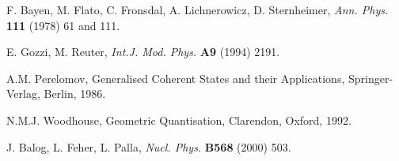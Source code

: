 \documentclass[a4paper,12pt]{article}
\begin{document}
\begin{thebibliography}{xx}
 F. Bayen, M. Flato, C. Fronsdal, A. Lichnerowicz, D.
  Sternheimer, {\it Ann. Phys.} {\bf 111} (1978) 61 and 111.

 E. Gozzi, M. Reuter,
{\it  Int.J. Mod. Phys.} {\bf A9} (1994) 2191.


 A.M. Perelomov, Generalised Coherent States and
  their Applications, Springer-Verlag, Berlin, 1986.

 N.M.J. Woodhouse, Geometric Quantisation,
  Clarendon, Oxford, 1992.

 J. Balog, L. Feher, L. Palla, {\it Nucl. Phys.} {\bf
      B568} (2000) 503.

\end{thebibliography}
\end{document}
